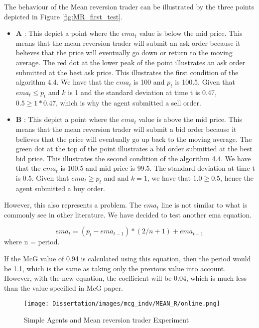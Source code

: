 The behaviour of the Mean reversion trader can be illustrated by the three points depicted in Figure \ref{fig:MR_first_test}. 
\begin{itemize}
  \item \textbf{A} : This depict a point where the $ema_{t}$ value is below the mid price. This means that the mean reversion trader will submit an ask order because it believes that the price will eventually go down or return to the moving average. The red dot at the lower peak of the point illustrates an ask order submitted at the best ask price. This illustrates the first condition of the algorithm 4.4. We have that the $ema_{t}$ is 100 and $p_t$ is 100.5. Given that $ema_t \leq p_t$ and $k$ is 1 and the standard deviation at time t is 0.47, $0.5 \ge 1 * 0.47$, which is why the agent submitted a sell order.
  
  \item \textbf{B} : This depict a point where the $ema_{t}$ value is above the mid price. This means that the mean reversion trader will submit a bid order because it believes that the price will eventually go up back to the moving average. The green dot at the top of the point illustrates a bid order submitted at the best bid price. This illustrates the second condition of the algorithm 4.4. We have that the $ema_{t}$ is 100.5 and mid price is 99.5. The standard deviation at time t is 0.5. Given that $ema_t \ge p_t$ and and $k = 1$, we have that $1.0 \ge 0.5$, hence the agent submitted a buy order. 
  
\end{itemize}

However, this also represents a problem. The $ema_{t}$ line is not similar to what is commonly see in other literature. We have decided to test another ema equation. 

\begin{equation}
ema_t = (p_{t} - ema_{t-1}) * (2 / n + 1) + ema_{t-1} 
\end{equation}
where n = period.

If the McG value of 0.94 is calculated using this equation, then the period would be 1.1, which is the same as taking only the previous value into account. However, with the new equation, the coefficient will be 0.04, which is much less than the value specified in McG paper. 

\begin{figure}[h]
\texttt{[image: Dissertation/images/mcg\_indv/MEAN\_R/online.png]}
\caption{Simple Agents and Mean reversion trader Experiment} 
\label{fig:MR_online}
\end{figure} 
\FloatBarrier

